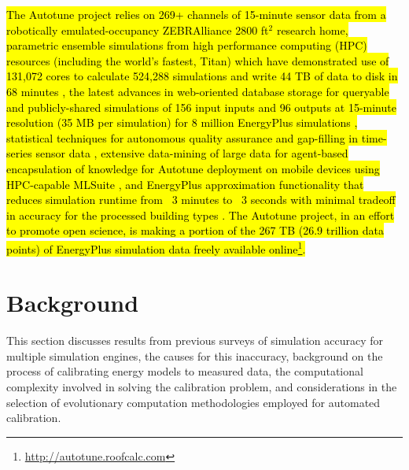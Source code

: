\documentclass[preprint, review, 12pt]{elsarticle}
\begin{document}
\hl{
The Autotune project relies on 269+ channels of 15-minute sensor data from a robotically emulated-occupancy ZEBRAlliance \cite{cit:miller2012,cit:biswas2012} 2800 ft$^2$ research home, parametric ensemble simulations from high performance computing (HPC) resources (including the world's fastest, Titan) which have demonstrated use of 131,072 cores to calculate 524,288 simulations and write 44 TB of data to disk in 68 minutes \cite{cit:sanyal2013a}, the latest advances in web-oriented database storage for queryable and publicly-shared simulations of 156 input inputs and 96 outputs at 15-minute resolution (35 MB per simulation) for 8 million EnergyPlus simulations \cite{cit:sanyal2013b}, statistical techniques for autonomous quality assurance and gap-filling in time-series sensor data \cite{cit:castello2012}, extensive data-mining of large data for agent-based encapsulation of knowledge for Autotune deployment on mobile devices using HPC-capable MLSuite \cite{cit:edwards2013}, and EnergyPlus approximation functionality that reduces simulation runtime from ~3 minutes to ~3 seconds with minimal tradeoff in accuracy for the processed building types \cite{cit:edwards2013}. The Autotune project, in an effort to promote open science, is making a portion of the 267 TB (26.9 trillion data points) of EnergyPlus simulation data freely available online\footnote{\url{http://autotune.roofcalc.com}}.
}

\section{Background}
\label{sec:background}
This section discusses results from previous surveys of simulation accuracy for multiple simulation engines, the causes for this inaccuracy, background on the process of calibrating energy models to measured data, the computational complexity involved in solving the calibration problem, and considerations in the selection of evolutionary computation methodologies employed for automated calibration.
\end{document}
